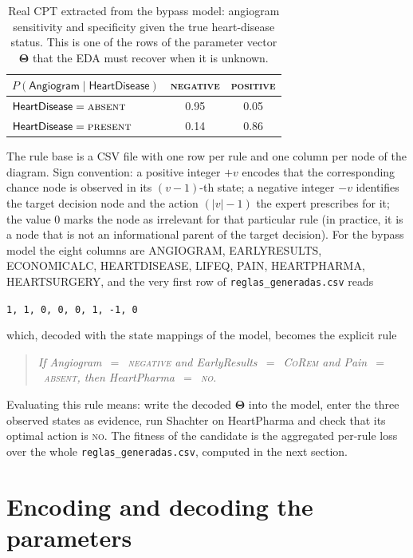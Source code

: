 \begin{table}[H]
\centering\small
\begin{tabular}{l|cc}
\hline
$P(\textsf{Angiogram} \mid \textsf{HeartDisease})$
              & \textsc{negative} & \textsc{positive}\\
\hline
$\textsf{HeartDisease} = \textsc{absent}$  & 0.95 & 0.05\\
$\textsf{HeartDisease} = \textsc{present}$ & 0.14 & 0.86\\
\hline
\end{tabular}
\caption{Real CPT extracted from the bypass model: angiogram
sensitivity and specificity given the true heart-disease status.
This is one of the rows of the parameter vector $\boldsymbol{\Theta}$
that the EDA must recover when it is unknown.}
\label{tab:bypass-cpt}
\end{table}

The rule base is a CSV file with one row per rule and one column per
node of the diagram. Sign convention: a positive integer
$+v$ encodes that the corresponding chance node is observed in its
$(v{-}1)$-th state; a negative integer $-v$ identifies the target
decision node and the action $(\lvert v\rvert{-}1)$ the expert prescribes
for it; the value $0$ marks the node as irrelevant for that
particular rule (in practice, it is a node that is not an
informational parent of the target decision). For the bypass model
the eight columns are
\textsf{ANGIOGRAM, EARLYRESULTS, ECONOMICALC, HEARTDISEASE, LIFEQ,
PAIN, HEARTPHARMA, HEARTSURGERY},
and the very first row of \texttt{reglas\_generadas.csv} reads
\begin{center}
\texttt{1, 1, 0, 0, 0, 1, -1, 0}
\end{center}
which, decoded with the state mappings of the model, becomes the
explicit rule
\begin{quote}
\emph{If \textsf{Angiogram}~$=$~\textsc{negative} \;and\;
\textsf{EarlyResults}~$=$~\textsc{CoRem} \;and\;
\textsf{Pain}~$=$~\textsc{absent},
\quad then \;\textsf{HeartPharma}~$=$~\textsc{no}.}
\end{quote}
Evaluating this rule means: write the decoded $\boldsymbol{\Theta}$
into the model, enter the three observed states as evidence, run
Shachter on \textsf{HeartPharma} and check that its optimal action is
\textsc{no}. The fitness of the candidate is the aggregated per-rule
loss over the whole \texttt{reglas\_generadas.csv}, computed in the
next section.

\section{Encoding and decoding the parameters}

